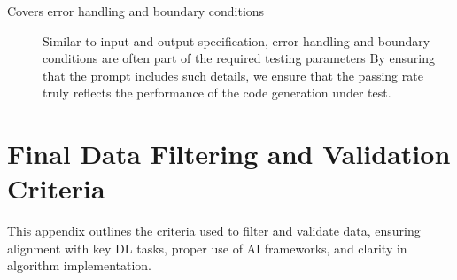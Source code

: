 \begin{description}
\item[Covers error handling and boundary conditions]
Similar to input and output specification, error handling and boundary conditions are often part of the required testing parameters
By ensuring that the prompt includes such details, we ensure that the passing rate truly reflects the performance of the code generation under test.
\end{description}

\section{Final Data Filtering and Validation Criteria}

This appendix outlines the criteria used to filter and validate data, ensuring alignment with key DL tasks, proper use of AI frameworks, and clarity in algorithm implementation.

